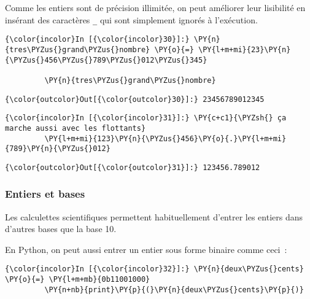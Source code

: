     Comme les entiers sont de précision illimitée, on peut améliorer leur
lisibilité en insérant des caractères \texttt{\_} qui sont simplement
ignorés à l'exécution.

    \begin{Verbatim}[commandchars=\\\{\},frame=single,framerule=0.3mm,rulecolor=\color{cellframecolor}]
{\color{incolor}In [{\color{incolor}30}]:} \PY{n}{tres\PYZus{}grand\PYZus{}nombre} \PY{o}{=} \PY{l+m+mi}{23}\PY{n}{\PYZus{}456\PYZus{}789\PYZus{}012\PYZus{}345}
         
         \PY{n}{tres\PYZus{}grand\PYZus{}nombre}
\end{Verbatim}


\begin{Verbatim}[commandchars=\\\{\},frame=single,framerule=0.3mm,rulecolor=\color{cellframecolor}]
{\color{outcolor}Out[{\color{outcolor}30}]:} 23456789012345
\end{Verbatim}
            
    \begin{Verbatim}[commandchars=\\\{\},frame=single,framerule=0.3mm,rulecolor=\color{cellframecolor}]
{\color{incolor}In [{\color{incolor}31}]:} \PY{c+c1}{\PYZsh{} ça marche aussi avec les flottants}
         \PY{l+m+mi}{123}\PY{n}{\PYZus{}456}\PY{o}{.}\PY{l+m+mi}{789}\PY{n}{\PYZus{}012}
\end{Verbatim}


\begin{Verbatim}[commandchars=\\\{\},frame=single,framerule=0.3mm,rulecolor=\color{cellframecolor}]
{\color{outcolor}Out[{\color{outcolor}31}]:} 123456.789012
\end{Verbatim}
            
    \hypertarget{entiers-et-bases}{%
\subsubsection{Entiers et bases}\label{entiers-et-bases}}

    Les calculettes scientifiques permettent habituellement d'entrer les
entiers dans d'autres bases que la base 10.

En Python, on peut aussi entrer un entier sous forme binaire comme
ceci~:

    \begin{Verbatim}[commandchars=\\\{\},frame=single,framerule=0.3mm,rulecolor=\color{cellframecolor}]
{\color{incolor}In [{\color{incolor}32}]:} \PY{n}{deux\PYZus{}cents} \PY{o}{=} \PY{l+m+mb}{0b11001000}
         \PY{n+nb}{print}\PY{p}{(}\PY{n}{deux\PYZus{}cents}\PY{p}{)}
\end{Verbatim}



